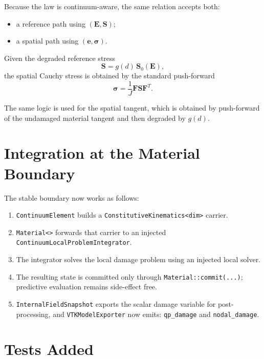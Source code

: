 Because the law is continuum-aware, the same relation accepts both:
\begin{itemize}
  \item a reference path using $(\mathbf{E}, \mathbf{S})$;
  \item a spatial path using $(\mathbf{e}, \boldsymbol{\sigma})$.
\end{itemize}

Given the degraded reference stress
\[
  \mathbf{S} = g(d)\,\mathbf{S}_0(\mathbf{E}),
\]
the spatial Cauchy stress is obtained by the standard push-forward
\[
  \boldsymbol{\sigma}
  = \frac{1}{J}\mathbf{F}\mathbf{S}\mathbf{F}^T.
\]

The same logic is used for the spatial tangent, which is obtained by
push-forward of the undamaged material tangent and then degraded by $g(d)$.

\section{Integration at the Material Boundary}

The stable boundary now works as follows:
\begin{enumerate}
  \item \texttt{ContinuumElement} builds a
        \texttt{ConstitutiveKinematics<dim>} carrier.
  \item \texttt{Material<>} forwards that carrier to an injected
        \texttt{ContinuumLocalProblemIntegrator}.
  \item The integrator solves the local damage problem using an injected local
        solver.
  \item The resulting state is committed only through
        \texttt{Material::commit(...)}; predictive evaluation remains
        side-effect free.
  \item \texttt{InternalFieldSnapshot} exports the scalar damage variable for
        post-processing, and \texttt{VTKModelExporter} now emits:
        \texttt{qp\_damage} and \texttt{nodal\_damage}.
\end{enumerate}

\section{Tests Added}

